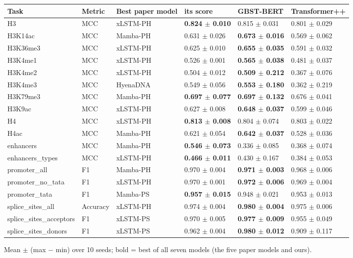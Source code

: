\documentclass[11pt,a4paper]{article}
\begin{document}
\begin{center}\footnotesize
\begin{tabular}{llllll}
\toprule
Task & Metric & Best paper model & its score & GBST-BERT & Transformer++ \\
\midrule
H3 & MCC & xLSTM-PH & \textbf{0.824 $\pm$ 0.010} & 0.815 $\pm$ 0.031 & 0.801 $\pm$ 0.029 \\
H3K14ac & MCC & Mamba-PH & 0.631 $\pm$ 0.026 & \textbf{0.673 $\pm$ 0.016} & 0.569 $\pm$ 0.062 \\
H3K36me3 & MCC & xLSTM-PH & 0.625 $\pm$ 0.010 & \textbf{0.655 $\pm$ 0.035} & 0.591 $\pm$ 0.032 \\
H3K4me1 & MCC & xLSTM-PH & 0.526 $\pm$ 0.001 & \textbf{0.565 $\pm$ 0.038} & 0.481 $\pm$ 0.037 \\
H3K4me2 & MCC & xLSTM-PH & 0.504 $\pm$ 0.012 & \textbf{0.509 $\pm$ 0.212} & 0.367 $\pm$ 0.076 \\
H3K4me3 & MCC & HyenaDNA & 0.549 $\pm$ 0.056 & \textbf{0.553 $\pm$ 0.180} & 0.362 $\pm$ 0.219 \\
H3K79me3 & MCC & Mamba-PH & \textbf{0.697 $\pm$ 0.077} & \textbf{0.697 $\pm$ 0.132} & 0.676 $\pm$ 0.041 \\
H3K9ac & MCC & xLSTM-PH & 0.627 $\pm$ 0.008 & \textbf{0.648 $\pm$ 0.037} & 0.599 $\pm$ 0.046 \\
H4 & MCC & xLSTM-PH & \textbf{0.813 $\pm$ 0.008} & 0.804 $\pm$ 0.074 & 0.803 $\pm$ 0.022 \\
H4ac & MCC & Mamba-PH & 0.621 $\pm$ 0.054 & \textbf{0.642 $\pm$ 0.037} & 0.528 $\pm$ 0.036 \\
enhancers & MCC & Mamba-PH & \textbf{0.546 $\pm$ 0.073} & 0.336 $\pm$ 0.085 & 0.368 $\pm$ 0.074 \\
enhancers\_types & MCC & xLSTM-PH & \textbf{0.466 $\pm$ 0.011} & 0.430 $\pm$ 0.167 & 0.384 $\pm$ 0.053 \\
promoter\_all & F1 & Mamba-PH & 0.970 $\pm$ 0.004 & \textbf{0.971 $\pm$ 0.003} & 0.968 $\pm$ 0.006 \\
promoter\_no\_tata & F1 & xLSTM-PH & 0.970 $\pm$ 0.001 & \textbf{0.972 $\pm$ 0.006} & 0.969 $\pm$ 0.004 \\
promoter\_tata & F1 & Mamba-PS & \textbf{0.957 $\pm$ 0.015} & 0.948 $\pm$ 0.021 & 0.953 $\pm$ 0.013 \\
splice\_sites\_all & Accuracy & xLSTM-PH & 0.974 $\pm$ 0.004 & \textbf{0.980 $\pm$ 0.004} & 0.975 $\pm$ 0.006 \\
splice\_sites\_acceptors & F1 & xLSTM-PS & 0.970 $\pm$ 0.005 & \textbf{0.977 $\pm$ 0.009} & 0.955 $\pm$ 0.049 \\
splice\_sites\_donors & F1 & xLSTM-PS & 0.962 $\pm$ 0.004 & \textbf{0.980 $\pm$ 0.012} & 0.909 $\pm$ 0.117 \\
\bottomrule
\end{tabular}
\end{center}
{\footnotesize Mean $\pm$ (max $-$ min) over 10 seeds; bold = best of all seven models (the five
paper models and ours).}
\end{document}
